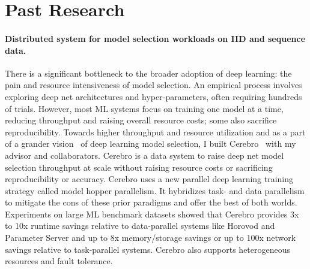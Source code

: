 \documentclass[letterpaper]{article}
\begin{document}
\section*{Past Research}


\paragraph{Distributed system for model selection workloads on IID and sequence data.} There is a significant bottleneck to the broader adoption of deep learning: the pain and resource intensiveness of model selection. An empirical process involves exploring deep net architectures and hyper-parameters, often requiring hundreds of trials. However, most ML systems focus on training one model at a time, reducing throughput and raising overall resource costs; some also sacrifice reproducibility. Towards higher throughput and resource utilization and as a part of a grander vision~\cite{cerebrocidr, kdd} of deep learning model selection, I built Cerebro~\cite{cerebro} with my advisor and collaborators. Cerebro is a data system to raise deep net model selection throughput at scale without raising resource costs or sacrificing reproducibility or accuracy. Cerebro uses a new parallel deep learning training strategy called model hopper parallelism. It hybridizes task- and data parallelism to mitigate the cons of these prior paradigms and offer the best of both worlds. Experiments on large ML benchmark datasets showed that Cerebro provides 3x to 10x runtime savings relative to data-parallel systems like Horovod and Parameter Server and up to 8x memory/storage savings or up to 100x network savings relative to task-parallel systems. Cerebro also supports heterogeneous resources and fault tolerance.
\end{document}
